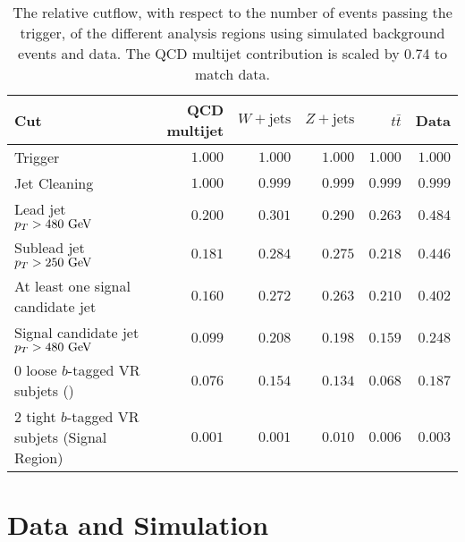\begin{table}[htpb]
 \centering
 \caption[The relative cutflow, with respect to the number of events passing the trigger, of the different analysis regions using simulated background events and data.]{%
  The relative cutflow, with respect to the number of events passing the trigger, of the different analysis regions using simulated background events and data.
  The QCD multijet contribution is scaled by 0.74 to match data.}
 \begin{adjustbox}{max width=\textwidth}
  \begin{tabular}{@{}lrrrrr@{}}
   \toprule
   Cut                                             & QCD multijet & $W+\mathrm{jets}$ & $Z+\mathrm{jets}$ & $t\bar{t}$ & Data    \\ \midrule
   Trigger                                         & $1.000$      & $1.000$           & $1.000$           & $1.000$    & $1.000$ \\
   Jet Cleaning                                    & $1.000$      & $0.999$           & $0.999$           & $0.999$    & $0.999$ \\
   Lead \largeR{} jet $p_{T} > 480~\mathrm{GeV}$           & $0.200$      & $0.301$           & $0.290$           & $0.263$    & $0.484$ \\
   Sublead \largeR{} jet $p_{T} > 250~\mathrm{GeV}$        & $0.181$      & $0.284$           & $0.275$           & $0.218$    & $0.446$ \\
   At least one signal candidate jet               & $0.160$      & $0.272$           & $0.263$           & $0.210$    & $0.402$ \\
   Signal candidate jet $p_{T} > 480~\mathrm{GeV}$         & $0.099$      & $0.208$           & $0.198$           & $0.159$    & $0.248$ \\
   $0$ loose $b$-tagged VR subjets (\CRQCD{})      & $0.076$      & $0.154$           & $0.134$           & $0.068$    & $0.187$ \\
   $2$ tight $b$-tagged VR subjets (Signal Region) & $0.001$      & $0.001$           & $0.010$           & $0.006$    & $0.003$ \\
   \bottomrule
  \end{tabular}
 \end{adjustbox}
 \label{table:cutflow_relative}
\end{table}

\section{Data and Simulation}\label{sec:data_and_simulation}

